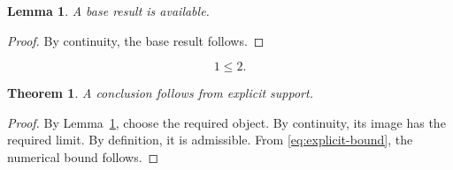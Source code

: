 \documentclass{article}
\newtheorem{lemma}{Lemma}
\newtheorem{theorem}{Theorem}
\begin{document}
\begin{lemma}\label{lem:explicit-base}
A base result is available.
\end{lemma}
\begin{proof}
By continuity, the base result follows.
\end{proof}

\begin{equation}\label{eq:explicit-bound}
1 \le 2.
\end{equation}

\begin{theorem}\label{thm:explicit-support}
A conclusion follows from explicit support.
\end{theorem}
\begin{proof}
By Lemma~\ref{lem:explicit-base}, choose the required object.
By continuity, its image has the required limit.
By definition, it is admissible.
From \eqref{eq:explicit-bound}, the numerical bound follows.
\end{proof}
\end{document}
